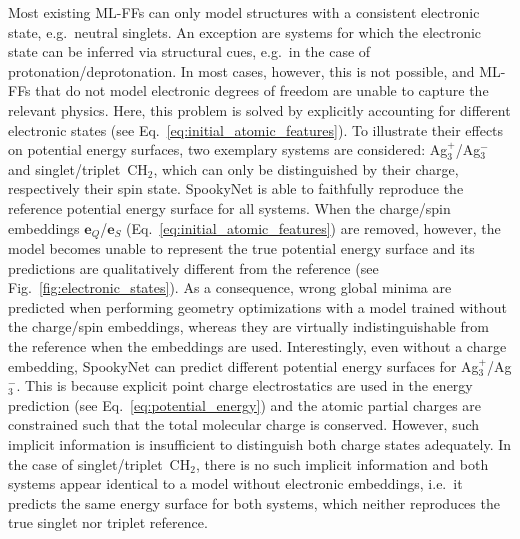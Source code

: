\documentclass[%
superscriptaddress,
reprint,
nofootinbib,
amsmath,amssymb,amsfonts,
floatfix,
altaffilletter,
showkeys,
]{revtex4-2}
\newcommand{\nn}{SpookyNet}
\begin{document}
Most existing ML-FFs can only model structures with a consistent electronic state, e.g.\ neutral singlets. An exception are systems for which the electronic state can be inferred via structural cues, e.g.\ in the case of protonation/deprotonation.\cite{unke2019physnet} In most cases, however, this is not possible, and ML-FFs that do not model electronic degrees of freedom are unable to capture the relevant physics. Here, this problem is solved by explicitly accounting for different electronic states (see Eq.~\ref{eq:initial_atomic_features}). To illustrate their effects on potential energy surfaces, two exemplary systems are considered: Ag$_3^+$/Ag$_3^-$ and singlet/triplet~CH$_2$, which can only be distinguished by their charge, respectively their spin state. \nn{} is able to faithfully reproduce the reference potential energy surface for all systems. When the charge/spin embeddings $\mathbf{e}_Q$/$\mathbf{e}_S$ (Eq.~\ref{eq:initial_atomic_features}) are removed, however,
the model becomes unable to represent the true potential energy surface and its predictions are qualitatively different from the reference (see Fig.~\ref{fig:electronic_states}). As a consequence, wrong global minima are predicted when performing geometry optimizations with a model trained without the charge/spin embeddings, whereas they are virtually indistinguishable from the reference when the embeddings are used. Interestingly, even without a charge embedding, \nn{} can predict different potential energy surfaces for Ag$_3^+$/Ag$_3^-$. This is because explicit point charge electrostatics are used in the energy prediction (see Eq.~\ref{eq:potential_energy}) and the atomic partial charges are constrained such that the total molecular charge is conserved. However, such implicit information is insufficient to distinguish both charge states adequately. In the case of singlet/triplet~CH$_2$, there is no such implicit information and both systems appear identical to a model without electronic embeddings, i.e.\ it predicts the same energy surface for both systems, which neither reproduces the true singlet nor triplet reference.
\end{document}
